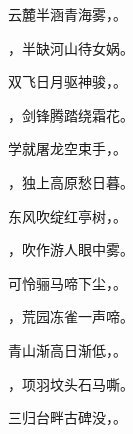 \documentclass[12pt, a4paper, addpoints, answers]{exam}
\begin{document}
\begin{questions}
\question[3] 云麓半涵青海雾，。

\question[3] ，半缺河山待女娲。

\question[3] 双飞日月驱神骏，。

\question[3] ，剑锋腾踏绕霜花。

\question[3] 学就屠龙空束手，。

\question[3] ，独上高原愁日暮。

\question[3] 东风吹绽红亭树，。

\question[3] ，吹作游人眼中雾。

\question[3] 可怜骊马啼下尘，。

\question[3] ，荒园冻雀一声啼。

\question[3] 青山渐高日渐低，。

\question[3] ，项羽坟头石马嘶。

\question[3] 三归台畔古碑没，。

\end{questions}

\hspace{5cm}
\end{document}

